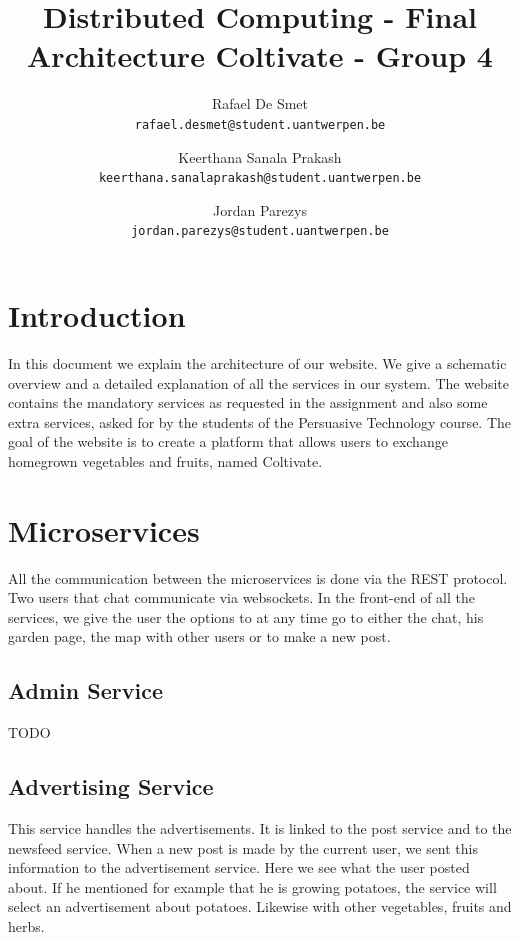 \documentclass[a4paper,12pt]{article}
\begin{document}
\title{Distributed Computing - Final Architecture Coltivate - Group 4}
\author{ Rafael De Smet \\
  \texttt{rafael.desmet@student.uantwerpen.be}  \and
  Keerthana Sanala Prakash \\
  \texttt{keerthana.sanalaprakash@student.uantwerpen.be} \and
  Jordan Parezys \\
  \texttt{jordan.parezys@student.uantwerpen.be}}
\date{}
\maketitle

\section{Introduction}

In this document we explain the architecture of our website. We give a schematic overview and a detailed explanation of all the services in our system. The website contains the mandatory services as requested in the assignment and also some extra services, asked for by the students of the Persuasive Technology course. The goal of the website is to create a platform that allows users to exchange homegrown vegetables and fruits, named Coltivate.

\section{Microservices}

All the communication between the microservices is done via the REST protocol. Two users that chat communicate via websockets. In the front-end of all the services, we give the user the options to at any time go to either the chat, his garden page, the map with other users or to make a new post.

\subsection{Admin Service}

TODO

\subsection{Advertising Service}

This service handles the advertisements. It is linked to the post service and to the newsfeed service. When a new post is made by the current user, we sent this information to the advertisement service. Here we see what the user posted about. If he mentioned for example that he is growing potatoes, the service will select an advertisement about potatoes. Likewise with other vegetables, fruits and herbs.
\newline
\end{document}
